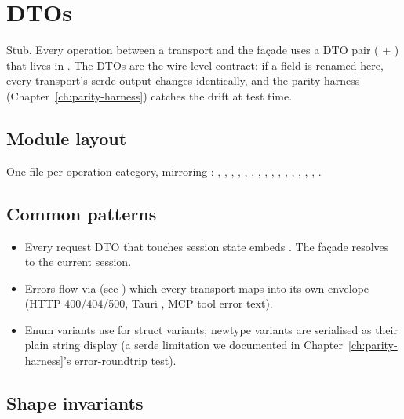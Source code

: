 \chapter{DTOs}
\label{ch:dtos}

\begin{note}
Stub. Every operation between a transport and the façade uses a
DTO pair ( + ) that lives in
. The DTOs are the
wire-level contract: if a field is renamed here, every transport's
serde output changes identically, and the parity harness
(Chapter~\ref{ch:parity-harness}) catches the drift at test time.
\end{note}

\section{Module layout}

One file per operation category, mirroring
: , ,
, , ,
, , ,
, , ,
, , ,
, .

\section{Common patterns}

\begin{itemize}
    \item Every request DTO that touches session state embeds
        . The façade resolves
         to the current session.
    \item Errors flow via  (see
        ) which every
        transport maps into its own envelope (HTTP 400/404/500,
        Tauri , MCP tool error text).
    \item Enum variants use \code{\#[serde(tag = "kind")]} for
        struct variants; newtype variants are serialised as their
        plain string display (a serde limitation we documented in
        Chapter~\ref{ch:parity-harness}'s error-roundtrip test).
\end{itemize}

\section{Shape invariants}

